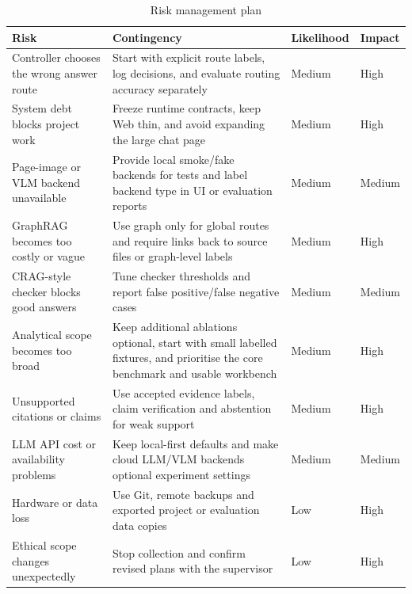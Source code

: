 \documentclass[a4paper,11pt]{article}
\begin{document}
\begin{table}[h]
\begin{center}
\begin{tabularx}{\textwidth}{|p{}|X|p{}|p{}|}
\hline
{\bf Risk} & {\bf Contingency} & {\bf Likelihood} & {\bf Impact} \\
\hline
\hline
Controller chooses the wrong answer route & Start with explicit route labels, log decisions, and evaluate routing accuracy separately & Medium & High \\
\hline
System debt blocks project work & Freeze runtime contracts, keep Web thin, and avoid expanding the large chat page & Medium & High \\
\hline
Page-image or VLM backend unavailable & Provide local smoke/fake backends for tests and label backend type in UI or evaluation reports & Medium & Medium \\
\hline
GraphRAG becomes too costly or vague & Use graph only for global routes and require links back to source files or graph-level labels & Medium & High \\
\hline
CRAG-style checker blocks good answers & Tune checker thresholds and report false positive/false negative cases & Medium & Medium \\
\hline
Analytical scope becomes too broad & Keep additional ablations optional, start with small labelled fixtures, and prioritise the core benchmark and usable workbench & Medium & High \\
\hline
Unsupported citations or claims & Use accepted evidence labels, claim verification and abstention for weak support & Medium & High \\
\hline
LLM API cost or availability problems & Keep local-first defaults and make cloud LLM/VLM backends optional experiment settings & Medium & Medium \\
\hline
Hardware or data loss & Use Git, remote backups and exported project or evaluation data copies & Low & High \\
\hline
Ethical scope changes unexpectedly & Stop collection and confirm revised plans with the supervisor & Low & High \\
\hline
\end{tabularx}
\end{center}
\caption{Risk management plan}
\label{risk}
\end{table}

\clearpage
\end{document}
